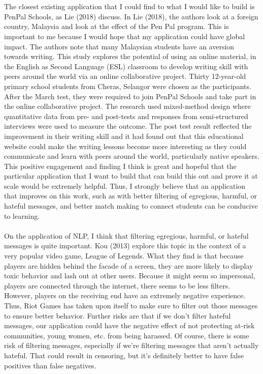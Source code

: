 \documentclass[12pt, final]{article}
\begin{document}
\\
\\
The closest existing application that I could find to what I would like to build is PenPal Schools, as Lie (2018) discuss. In Lie (2018), the authors look at a foreign country, Malaysia and look at the effect of the Pen Pal program. This is important to me because I would hope that my application could have global impact. The authors note that many Malaysian students have an aversion towards writing. This study explores the potential of using an online material, in the English as Second Language (ESL) classroom to develop writing skill with peers around the world via an online collaborative project. Thirty 12-year-old primary school students from Cheras, Selangor were chosen as the participants. After the March test, they were required to join PenPal Schools and take part in the online collaborative project.  The research used mixed-method design where quantitative data from pre- and post-tests and responses from semi-structured interviews were used to measure the outcome. The post test result reflected the improvement in their writing skill and it had found out that this educational website could make the writing lessons become more interesting as they could communicate and learn with peers around the world, particularly native speakers. This positive engagement and finding I think is great and hopeful that the particular application that I want to build that can build this out and prove it at scale would be extremely helpful. Thus, I strongly believe that an application that improves on this work, such as with better filtering of egregious, harmful, or hateful messages, and better match making to connect students can be conducive to learning.
\\
\\
On the application of NLP, I think that filtering egregious, harmful, or hateful messages is quite important. Kou (2013) explore this topic in the context of a very popular video game, League of Legends. What they find is that because players are hidden behind the facade of a screen, they are more likely to display toxic behavior and lash out at other users. Because it might seem so impersonal, players are connected through the internet, there seems to be less filters. However, players on the receiving end have an extremely negative experience. Thus, Riot Games has taken upon itself to make sure to filter out those messages to ensure better behavior. Further risks are that if we don't filter hateful messages, our application could have the negative effect of not protecting at-risk communities, young women, etc. from being harassed. Of course, there is some risk of filtering messages, especially if we're filtering messages that aren't actually hateful. That could result in censoring, but it's definitely better to have false positives than false negatives. 
\end{document}
